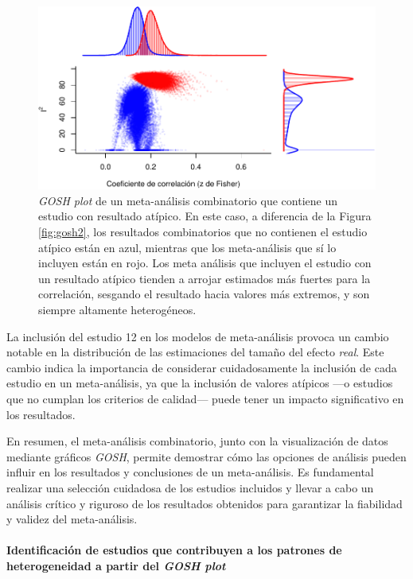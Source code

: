 \documentclass[
  bookmarksnumbered]{article}
\begin{document}
\begin{figure}
\centering
\includegraphics{Meta-analysis_files/figure-latex/gosh3-1.pdf}
\caption{\label{fig:gosh3}\emph{GOSH plot} de un meta-análisis combinatorio que contiene un estudio con resultado atípico. En este caso, a diferencia de la Figura \ref{fig:gosh2}, los resultados combinatorios que no contienen el estudio atípico están en azul, mientras que los meta-análisis que sí lo incluyen están en rojo. Los meta análisis que incluyen el estudio con un resultado atípico tienden a arrojar estimados más fuertes para la correlación, sesgando el resultado hacia valores más extremos, y son siempre altamente heterogéneos.}
\end{figure}

La inclusión del estudio 12 en los modelos de meta-análisis provoca un cambio notable en la distribución de las estimaciones del tamaño del efecto \emph{real}. Este cambio indica la importancia de considerar cuidadosamente la inclusión de cada estudio en un meta-análisis, ya que la inclusión de valores atípicos ---o estudios que no cumplan los criterios de calidad--- puede tener un impacto significativo en los resultados.

En resumen, el meta-análisis combinatorio, junto con la visualización de datos mediante gráficos \emph{GOSH}, permite demostrar cómo las opciones de análisis pueden influir en los resultados y conclusiones de un meta-análisis. Es fundamental realizar una selección cuidadosa de los estudios incluidos y llevar a cabo un análisis crítico y riguroso de los resultados obtenidos para garantizar la fiabilidad y validez del meta-análisis.

\hypertarget{fancy-gosh}{%
\paragraph{\texorpdfstring{Identificación de estudios que contribuyen a los patrones de heterogeneidad a partir del \emph{GOSH plot}}{Identificación de estudios que contribuyen a los patrones de heterogeneidad a partir del GOSH plot}}\label{fancy-gosh}}
\end{document}
